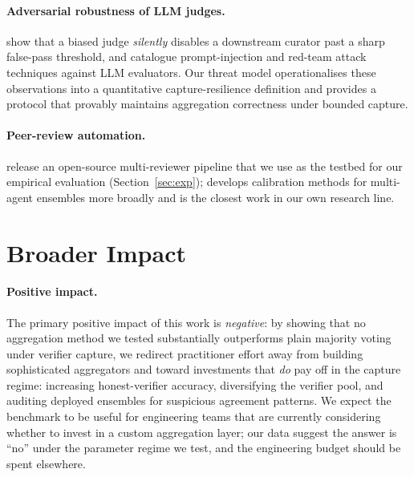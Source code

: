 \documentclass[11pt]{article}
\begin{document}
\paragraph{Adversarial robustness of LLM judges.}
\citet{zhang2026blindcurator} show that a biased judge \emph{silently}
disables a downstream curator past a sharp false-pass threshold, and
\citet{perez2022red,schulhoff2023ignore} catalogue prompt-injection and
red-team attack techniques against LLM evaluators. Our threat model
operationalises these observations into a quantitative capture-resilience
definition and provides a protocol that provably maintains aggregation
correctness under bounded capture.

\paragraph{Peer-review automation.}
\citet{liu2026paperreviewtoolkit} release an open-source multi-reviewer
pipeline that we use as the testbed for our empirical evaluation
(Section~\ref{sec:exp}); \citet{liu2026calibration} develops calibration
methods for multi-agent ensembles more broadly and is the closest work
in our own research line.

\section{Broader Impact}
\label{sec:broader}

\paragraph{Positive impact.}
The primary positive impact of this work is \emph{negative}: by
showing that no aggregation method we tested substantially outperforms
plain majority voting under verifier capture, we redirect practitioner
effort away from building sophisticated aggregators and toward
investments that \emph{do} pay off in the capture regime: increasing
honest-verifier accuracy, diversifying the verifier pool, and
auditing deployed ensembles for suspicious agreement patterns. We
expect the benchmark to be useful for engineering teams that are
currently considering whether to invest in a custom aggregation
layer; our data suggest the answer is ``no'' under the parameter
regime we test, and the engineering budget should be spent elsewhere.
\end{document}
